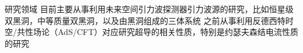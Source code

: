 
\begin{rubric}{研究领域}
\entry*[引力波天文学]
    目前主要从事利用未来空间引力波探测器引力波源的研究，比如恒星级双黑洞，中等质量双黑洞，以及由黑洞组成的三体系统 
\entry*[全息超导]
    之前从事利用反德西特时空/共性场论（AdS/CFT）对应研究超导的相关性质，特别是约瑟夫森结电流性质的研究 
\end{rubric}

